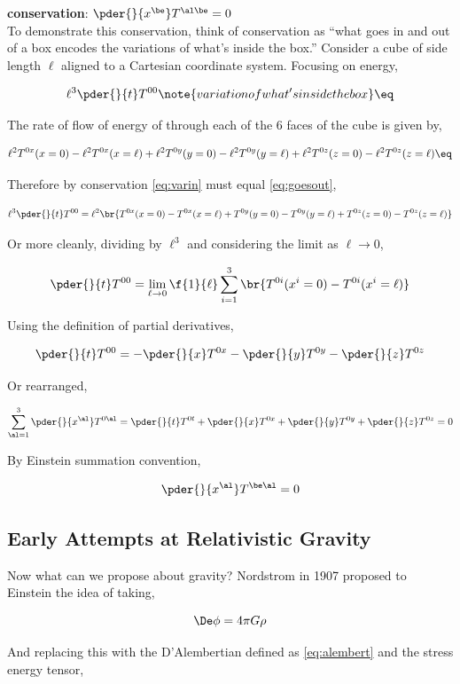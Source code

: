 \documentclass{article}
\begin{document}
\textbf{conservation}: $\pder{}{x^\be} T^{\al\be} = 0$ \\

To demonstrate this conservation, think of conservation as ``what goes in and out of a box encodes the variations of what's inside the box.'' Consider a cube of side length $\ell$ aligned to a Cartesian coordinate system. Focusing on energy,

\[ \ell^3 \pder{}{t} T^{00} \note{variation of what's inside the box} \eq \label{eq:varin} \]

The rate of flow of energy of through each of the 6 faces of the cube is given by,

\[ \ell^2 T^{0x}(x=0) - \ell^2T^{0x}(x=\ell) + \ell^2 T^{0y}(y=0) - \ell^2T^{0y}(y=\ell) + \ell^2 T^{0z}(z=0) - \ell^2T^{0z}(z=\ell) \eq \label{eq:goesout} \]

Therefore by conservation \eqref{eq:varin} must equal \eqref{eq:goesout},

\[ \ell^3 \pder{}{t} T^{00} = \ell^2 \br{T^{0x}(x=0) - T^{0x}(x=\ell) +  T^{0y}(y=0) - T^{0y}(y=\ell) +  T^{0z}(z=0) - T^{0z}(z=\ell)} \]

Or more cleanly, dividing by $\ell^3$ and considering the limit as $\ell \to 0$,

\[ \pder{}{t} T^{00} = \lim_{\ell \to 0} \f{1}{\ell} \sum_{i=1}^{3} \br{T^{0i} (x^i = 0) - T^{0i} (x^i = \ell)} \]

Using the definition of partial derivatives,

\[ \pder{}{t} T^{00} = -\pder{}{x}T^{0x}-\pder{}{y}T^{0y}-\pder{}{z}T^{0z} \]

Or rearranged,

\[ \sum_{\al=1}^{3} \pder{}{x^\al}T^{0\al} = \pder{}{t} T^{0t} + \pder{}{x}T^{0x} + \pder{}{y}T^{0y} + \pder{}{z}T^{0z} = 0 \]

By Einstein summation convention,

\[ \pder{}{x^\al}T^{\be\al} = 0 \]

\subsection{Early Attempts at Relativistic Gravity}

Now what can we propose about gravity? Nordstrom in 1907 proposed to Einstein the idea of taking,

\[ \De \phi = 4 \pi G \rho \]

And replacing this with the D'Alembertian defined as \eqref{eq:alembert} and the stress energy tensor,
\end{document}
